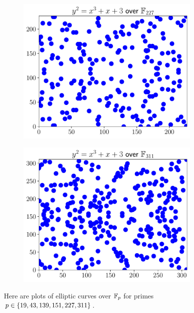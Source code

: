 \begin{figure}[p]
    \begin{subfigure}[t]{0.45\textwidth}
    \includegraphics[width=\textwidth]{plots/ec_finite/ec_finite_F_227_1_3.pdf}
    \end{subfigure}
    \begin{subfigure}[t]{0.45\textwidth}
    \includegraphics[width=\textwidth]{plots/ec_finite/ec_finite_F_311_1_3.pdf}
    \end{subfigure}
    \caption[Plots of elliptic curves over various finite fields]{Here
        are plots of \glspl{elliptic curve} over $\mathbb{F}_{p}$
        for primes $p\in\left\{ 19, 43, 139, 151, 227, 311 \right\}$.}
    \label{fig:ec_finite_plots_fields}
\end{figure}
